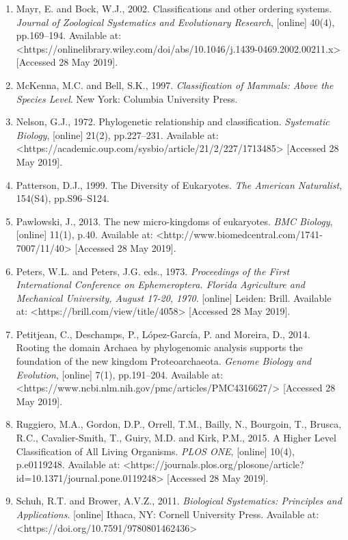 \documentclass[a4paper]{article}
\begin{document}
\begin{enumerate}
\item Mayr, E. and Bock, W.J., 2002. Classifications and other ordering systems. \textit{Journal of Zoological
Systematics and Evolutionary Research}, [online] 40(4), pp.169–194. Available at:
{\textless}https://onlinelibrary.wiley.com/doi/abs/10.1046/j.1439-0469.2002.00211.x{\textgreater} [Accessed 28 May
2019].
\item McKenna, M.C. and Bell, S.K., 1997. \textit{Classification of Mammals: Above the Species Level}. New York:
Columbia University Press.
\item Nelson, G.J., 1972. Phylogenetic relationship and classification. \textit{Systematic Biology}, [online] 21(2),
pp.227–231. Available at: {\textless}https://academic.oup.com/sysbio/article/21/2/227/1713485{\textgreater} [Accessed
28 May 2019].
\item Patterson, D.J., 1999. The Diversity of Eukaryotes. \textit{The American Naturalist}, 154(S4), pp.S96–S124.
\item Pawlowski, J., 2013. The new micro-kingdoms of eukaryotes. \textit{BMC Biology}, [online] 11(1), p.40. Available
at: {\textless}http://www.biomedcentral.com/1741-7007/11/40{\textgreater} [Accessed 28 May 2019].
\item Peters, W.L. and Peters, J.G. eds., 1973. \textit{Proceedings of the First International Conference on
Ephemeroptera. Florida Agriculture and Mechanical University, August 17-20, 1970}. [online] Leiden: Brill. Available
at: {\textless}https://brill.com/view/title/4058{\textgreater} [Accessed 28 May 2019].
\item Petitjean, C., Deschamps, P., López-García, P. and Moreira, D., 2014. Rooting the domain Archaea by phylogenomic
analysis supports the foundation of the new kingdom Proteoarchaeota. \textit{Genome Biology and Evolution}, [online]
7(1), pp.191–204. Available at: {\textless}https://www.ncbi.nlm.nih.gov/pmc/articles/PMC4316627/{\textgreater}
[Accessed 28 May 2019].
\item Ruggiero, M.A., Gordon, D.P., Orrell, T.M., Bailly, N., Bourgoin, T., Brusca, R.C., Cavalier-Smith, T., Guiry,
M.D. and Kirk, P.M., 2015. A Higher Level Classification of All Living Organisms. \textit{PLOS ONE}, [online] 10(4),
p.e0119248. Available at:
{\textless}https://journals.plos.org/plosone/article?id=10.1371/journal.pone.0119248{\textgreater} [Accessed 28 May
2019].
\item Schuh, R.T. and Brower, A.V.Z., 2011. \textit{Biological Systematics: Principles and Applications}. [online]
Ithaca, NY: Cornell University Press. Available at: {\textless}https://doi.org/10.7591/9780801462436{\textgreater}

\end{enumerate}
\end{document}
